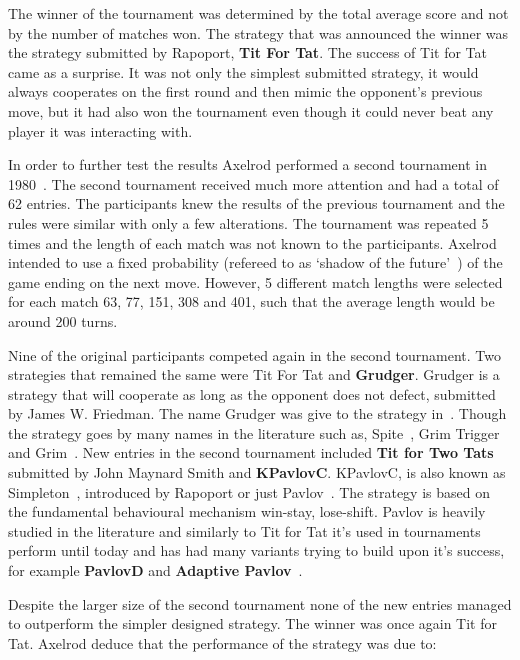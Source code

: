 \documentclass{article}
\theoremstyle{definition}
\begin{document}
The winner of the tournament was determined by the total average score and not
by the number of matches won. The strategy that was announced the winner was the
strategy submitted by Rapoport, \textbf{Tit For Tat}. The success of Tit for Tat
came as a surprise. It was not only the simplest submitted strategy, it would
always cooperates on the first round and then mimic the opponent's previous
move, but it had also won the tournament even though it could never beat
any player it was interacting with.

In order to further test the results Axelrod performed a second tournament
in 1980~\cite{Axelrod1980b}. The second tournament received much more attention
and had a total of 62 entries. The participants knew the results of the previous
tournament and the rules were similar with only a few alterations. The
tournament was repeated 5 times and the length of each match was not known to
the participants. Axelrod intended to use a fixed probability (refereed to as
`shadow of the future'~\cite{Axelrod1988}) of the game ending on the next move.
However, 5 different match lengths were selected for each match 63, 77, 151,
308 and 401, such that the average length would be around 200 turns.

Nine of the original participants competed again in the second tournament. Two
strategies that remained the same were Tit For Tat and \textbf{Grudger}. Grudger
is a strategy that will cooperate as long as the opponent does not defect,
submitted by James W. Friedman. The name Grudger was give to the strategy
in~\cite{Li2014}. Though the strategy goes by many names in the literature such
as, Spite~\cite{Beaufils1997}, Grim Trigger~\cite{Banks1990} and
Grim~\cite{Van2015}. New entries in the second tournament included \textbf{Tit
for Two Tats} submitted by John Maynard Smith and \textbf{KPavlovC}. KPavlovC,
is also known as Simpleton~\cite{rapoport1965}, introduced by Rapoport or just
Pavlov~\cite{Nowak1993}. The strategy is based on the fundamental behavioural
mechanism win-stay, lose-shift. Pavlov is heavily studied in the literature and
similarly to Tit for Tat it's used in tournaments perform until today and has
had many variants trying to build upon it's success, for example
\textbf{PavlovD} and \textbf{Adaptive Pavlov}~\cite{Li2007}.

Despite the larger size of the second tournament none of the new entries managed
to outperform the simpler designed strategy. The winner was once again Tit for
Tat. Axelrod deduce that the performance of the strategy was due to:
\end{document}
